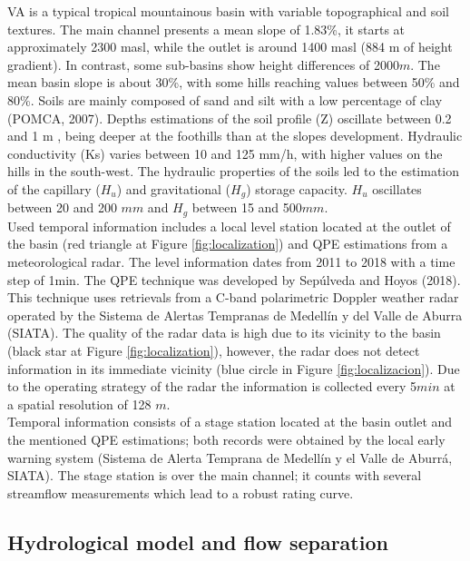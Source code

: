 \documentclass[preprint,12pt]{elsarticle}
\begin{document}
VA is a typical tropical mountainous basin with variable topographical and soil textures. The main channel presents a mean slope of 1.83\%, it starts at approximately 2300 masl, while the outlet is around 1400 masl (884 m of height gradient). In contrast, some sub-basins show height differences of 2000$m$. The mean basin slope is about 30\%, with some hills reaching values between 50\% and 80\%.  Soils are mainly composed of sand and silt with a low percentage of clay (POMCA, 2007). Depths estimations of the soil profile (Z) oscillate between 0.2 and 1 m \citep{Osorio2008}, being deeper at the foothills than at the slopes development. Hydraulic conductivity (Ks) varies between 10 and 125 mm/h, with higher values on the hills in the south-west.  The hydraulic properties of the soils led to the estimation of the capillary ($H_u$) and gravitational ($H_g$) storage capacity. $H_u$ oscillates between 20 and 200 $mm$ and $H_g$ between 15 and 500$mm$.\\

Used temporal information includes a local level station located at the outlet of the basin (red triangle at Figure \ref{fig:localization}) and QPE estimations from a meteorological radar.  The level information dates from 2011 to 2018 with a time step of 1min.  The QPE technique was developed by Sepúlveda and Hoyos (2018).  This technique uses retrievals from a C-band polarimetric Doppler weather radar operated by the Sistema de Alertas Tempranas de Medellín y del Valle de Aburra (SIATA).  The quality of the radar data is high due to its vicinity to the basin (black star at Figure \ref{fig:localization}), however, the radar does not detect information in its immediate vicinity (blue circle in Figure \ref{fig:localizacion}).  Due to the operating strategy of the radar the information is collected every 5$min$ at a spatial resolution of 128 $m$.\\

Temporal information consists of a stage station located at the basin outlet and the mentioned QPE estimations; both records were obtained by the local early warning system (Sistema de Alerta Temprana de Medellín y el Valle de Aburrá, SIATA). The stage station is over the main channel; it counts with several streamflow measurements which lead to a robust rating curve.\\

\subsection{Hydrological model and flow separation }
\end{document}
